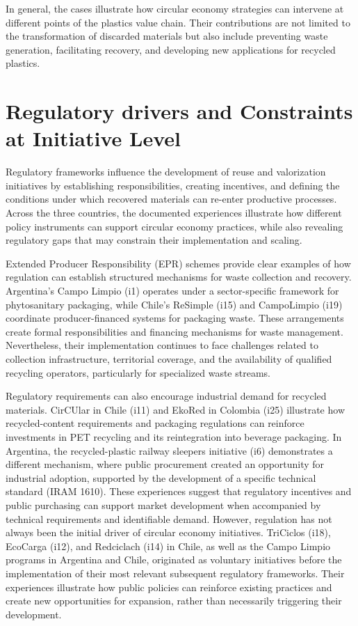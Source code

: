 \documentclass[
  12pt,
  oneside]{book}
\begin{document}
In general, the cases illustrate how circular economy strategies can
intervene at different points of the plastics value chain. Their
contributions are not limited to the transformation of discarded
materials but also include preventing waste generation, facilitating
recovery, and developing new applications for recycled plastics.

\section{Regulatory drivers and Constraints at Initiative
Level}\label{regulatory-drivers-and-constraints-at-initiative-level}

Regulatory frameworks influence the development of reuse and
valorization initiatives by establishing responsibilities, creating
incentives, and defining the conditions under which recovered materials
can re-enter productive processes. Across the three countries, the
documented experiences illustrate how different policy instruments can
support circular economy practices, while also revealing regulatory gaps
that may constrain their implementation and scaling.

Extended Producer Responsibility (EPR) schemes provide clear examples of
how regulation can establish structured mechanisms for waste collection
and recovery. Argentina's Campo Limpio (i1) operates under a
sector-specific framework for phytosanitary packaging, while Chile's
ReSimple (i15) and CampoLimpio (i19) coordinate producer-financed
systems for packaging waste. These arrangements create formal
responsibilities and financing mechanisms for waste management.
Nevertheless, their implementation continues to face challenges related
to collection infrastructure, territorial coverage, and the availability
of qualified recycling operators, particularly for specialized waste
streams.

Regulatory requirements can also encourage industrial demand for
recycled materials. CirCUlar in Chile (i11) and EkoRed in Colombia (i25)
illustrate how recycled-content requirements and packaging regulations
can reinforce investments in PET recycling and its reintegration into
beverage packaging. In Argentina, the recycled-plastic railway sleepers
initiative (i6) demonstrates a different mechanism, where public
procurement created an opportunity for industrial adoption, supported by
the development of a specific technical standard (IRAM 1610). These
experiences suggest that regulatory incentives and public purchasing can
support market development when accompanied by technical requirements
and identifiable demand. However, regulation has not always been the
initial driver of circular economy initiatives. TriCiclos (i18),
EcoCarga (i12), and Redciclach (i14) in Chile, as well as the Campo
Limpio programs in Argentina and Chile, originated as voluntary
initiatives before the implementation of their most relevant subsequent
regulatory frameworks. Their experiences illustrate how public policies
can reinforce existing practices and create new opportunities for
expansion, rather than necessarily triggering their development.
\end{document}
